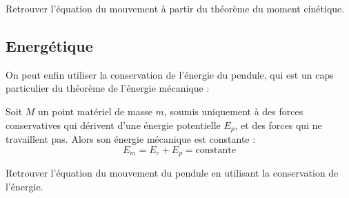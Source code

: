\documentclass[11pt,fleqn]{book} %
\begin{document}
\begin{capex}
	Retrouver l'équation du mouvement à partir du théorème du moment cinétique.
\end{capex}


\subsection{Energétique}

On peut enfin utiliser la conservation de l'énergie du pendule, qui est un caps particulier du théorème de l'énergie mécanique :

\begin{theorem}
    Soit $M$ un point matériel de masse $m$, soumis uniquement à des forces conservatives qui dérivent d'une énergie potentielle $E_p$, et des forces qui ne travaillent pas. Alors son énergie mécanique est constante :
    \begin{equation}
        E_m = E_c + E_p = \mathrm{constante}
    \end{equation}
\end{theorem}

\begin{capex}
	Retrouver l'équation du mouvement du pendule en utilisant la conservation de l'énergie.
\end{capex}
\end{document}
